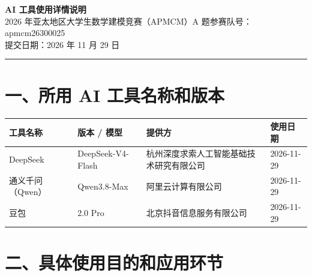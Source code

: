 \documentclass[11pt,a4paper]{ctexart}
\begin{document}
\begin{center}
{\Large\bfseries AI 工具使用详情说明}\\[6pt]
{\normalsize 2026 年亚太地区大学生数学建模竞赛（APMCM）\quad A 题\quad 参赛队号：apmcm26300025}\\[4pt]
{\small 提交日期：2026 年 11 月 29 日}
\end{center}

\vspace{4pt}
\hrule
\vspace{10pt}

\section*{一、所用 AI 工具名称和版本}

\begin{table}[h]
\centering
\small
\begin{tabular}{@{}p{2.9cm}p{3.2cm}p{5.2cm}p{2.2cm}@{}}
\toprule
工具名称 & 版本 / 模型 & 提供方 & 使用日期 \\
\midrule
DeepSeek & DeepSeek-V4-Flash & 杭州深度求索人工智能基础技术研究有限公司 & 2026-11-29 \\
通义千问（Qwen） & Qwen3.8-Max & 阿里云计算有限公司 & 2026-11-29 \\
豆包 & 2.0 Pro & 北京抖音信息服务有限公司 & 2026-11-29 \\
\bottomrule
\end{tabular}
\end{table}

\section*{二、具体使用目的和应用环节}
\end{document}
